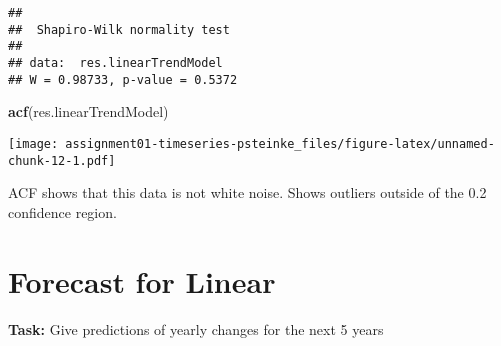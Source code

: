 \documentclass[]{article}
\newenvironment{Shaded}{\begin{snugshade}}{\end{snugshade}}
\newcommand{\KeywordTok}[1]{\textcolor[rgb]{0.13,0.29,0.53}{\textbf{#1}}}
\newcommand{\NormalTok}[1]{#1}
\begin{document}
\begin{verbatim}
## 
##  Shapiro-Wilk normality test
## 
## data:  res.linearTrendModel
## W = 0.98733, p-value = 0.5372
\end{verbatim}

\begin{Shaded}
\begin{Highlighting}[]
\KeywordTok{acf}\NormalTok{(res.linearTrendModel)}
\end{Highlighting}
\end{Shaded}

\texttt{[image: assignment01-timeseries-psteinke\_files/figure-latex/unnamed-chunk-12-1.pdf]}

ACF shows that this data is not white noise. Shows outliers outside of
the 0.2 confidence region.

\hypertarget{forecast-for-linear}{%
\section{Forecast for Linear}\label{forecast-for-linear}}

\textbf{Task:} Give predictions of yearly changes for the next 5 years
\end{document}
